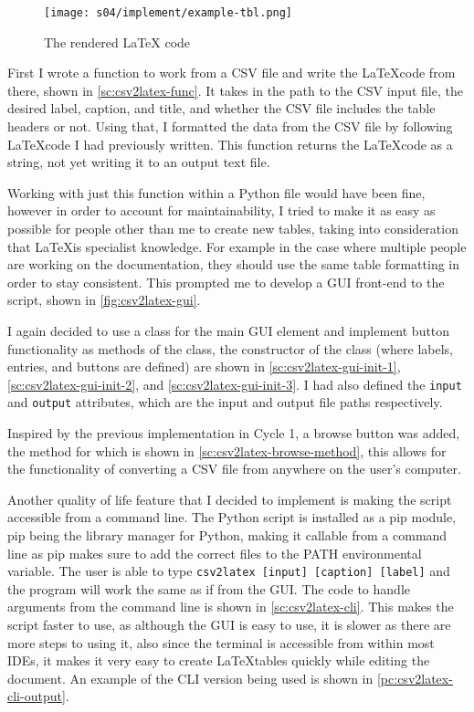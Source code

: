        \begin{figure}[!ht]
            \centering
            \texttt{[image: s04/implement/example-tbl.png]}
            \caption{The rendered LaTeX code}
            \label{fig:rendered-csv2latex-table}
        \end{figure}

        First I wrote a function to work from a CSV file and write the \LaTeX code from there, shown in \autoref{sc:csv2latex-func}. 
        It takes in the path to the CSV input file, the desired label, caption, and title, and whether the CSV file includes the table headers or not. Using that, I formatted the data from the CSV file by following \LaTeX code I had previously written. 
        This function returns the \LaTeX code as a string, not yet writing it to an output text file. 

        Working with just this function within a Python file would have been fine, however in order to account for maintainability, I tried to make it as easy as possible for people other than me to create new tables, taking into consideration that \LaTeX is specialist knowledge. For example in the case where multiple people are working on the documentation, they should use the same table formatting in order to stay consistent. 
        This prompted me to develop a GUI front-end to the script, shown in \autoref{fig:csv2latex-gui}.

        I again decided to use a class for the main GUI element and implement button functionality as methods of the class, the constructor of the class (where labels, entries, and buttons are defined) are shown in \autoref{sc:csv2latex-gui-init-1}, \autoref{sc:csv2latex-gui-init-2}, and \autoref{sc:csv2latex-gui-init-3}. 
        I had also defined the \verb|input| and \verb|output| attributes, which are the input and output file paths respectively. 

        Inspired by the previous implementation in Cycle 1, a browse button was added, the method for which is shown in \autoref{sc:csv2latex-browse-method}, this allows for the functionality of converting a CSV file from anywhere on the user's computer.

        Another quality of life feature that I decided to implement is making the script accessible from a command line. 
        The Python script is installed as a pip module, pip being the library manager for Python, making it callable from a command line as pip makes sure to add the correct files to the PATH environmental variable.  
        The user is able to type \verb|csv2latex [input] [caption] [label]| and the program will work the same as if from the GUI. 
        The code to handle arguments from the command line is shown in \autoref{sc:csv2latex-cli}.
        This makes the script faster to use, as although the GUI is easy to use, it is slower as there are more steps to using it, also since the terminal is accessible from within most IDEs, it makes it very easy to create \LaTeX tables quickly while editing the document. An example of the CLI version being used is shown in \autoref{pc:csv2latex-cli-output}.

